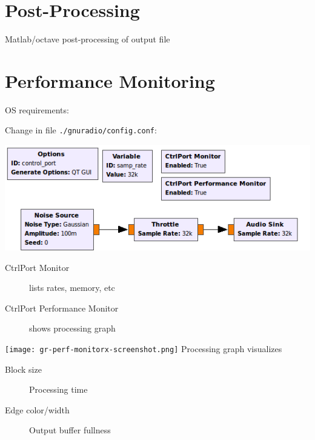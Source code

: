 \documentclass[10pt]{article}
\begin{document}
\begin{multicols*}{3}
\section*{Post-Processing}
Matlab/octave post-processing of output file


\section*{Performance Monitoring}
OS requirements:

Change in file \texttt{./gnuradio/config.conf}:


\includegraphics[width=0.99\linewidth]{control-port.png}
\begin{description}
\item[CtrlPort Monitor] lists rates, memory, etc
\item[CtrlPort Performance Monitor] shows processing graph
\end{description}

\texttt{[image: gr-perf-monitorx-screenshot.png]}
Processing graph visualizes
\begin{description}
\item[Block size] Processing time
\item[Edge color/width] Output buffer fullness
\end{description}


%
%
%
%
%

\end{multicols*}
\end{document}
